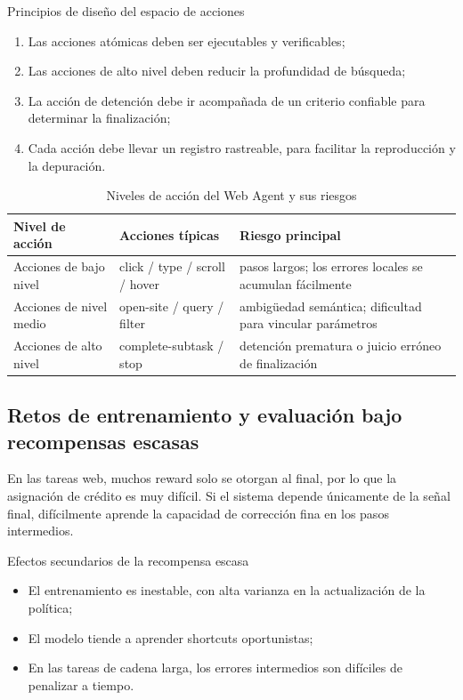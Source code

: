 \documentclass[a4paper]{article}
\begin{document}
\begin{importantbox}{Principios de diseño del espacio de acciones}
\begin{enumerate}
    \item Las acciones atómicas deben ser ejecutables y verificables;
    \item Las acciones de alto nivel deben reducir la profundidad de búsqueda;
    \item La acción de detención debe ir acompañada de un criterio confiable para determinar la finalización;
    \item Cada acción debe llevar un registro rastreable, para facilitar la reproducción y la depuración.
\end{enumerate}
\end{importantbox}

\begin{table}[H]
\centering
\small
\begin{tabular}{p{3.2cm}p{4.1cm}p{3.7cm}}
\toprule
\textbf{Nivel de acción} & \textbf{Acciones típicas} & \textbf{Riesgo principal} \\
\midrule
Acciones de bajo nivel & click / type / scroll / hover & pasos largos; los errores locales se acumulan fácilmente \\
Acciones de nivel medio & open-site / query / filter & ambigüedad semántica; dificultad para vincular parámetros \\
Acciones de alto nivel & complete-subtask / stop & detención prematura o juicio erróneo de finalización \\
\bottomrule
\end{tabular}
\caption{Niveles de acción del Web Agent y sus riesgos}
\end{table}

\subsection{Retos de entrenamiento y evaluación bajo recompensas escasas}
En las tareas web, muchos reward solo se otorgan al final, por lo que la asignación de crédito es muy difícil. Si el sistema depende únicamente de la señal final, difícilmente aprende la capacidad de corrección fina en los pasos intermedios.

\begin{warningbox}{Efectos secundarios de la recompensa escasa}
\begin{itemize}
    \item El entrenamiento es inestable, con alta varianza en la actualización de la política;
    \item El modelo tiende a aprender shortcuts oportunistas;
    \item En las tareas de cadena larga, los errores intermedios son difíciles de penalizar a tiempo.
\end{itemize}
\end{warningbox}
\end{document}
